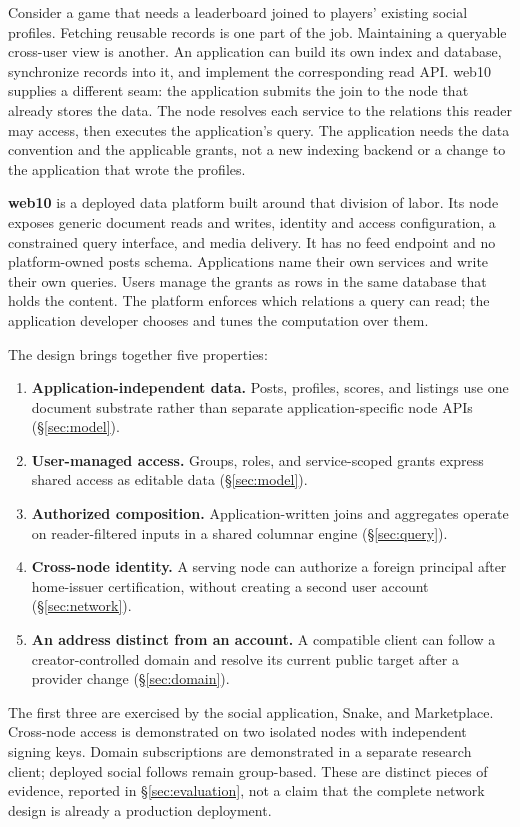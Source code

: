 \documentclass[sigconf, nonacm]{acmart}
\begin{document}
Consider a game that needs a leaderboard joined to players' existing
social profiles. Fetching reusable records is one part of the job.
Maintaining a queryable cross-user view is another. An application can
build its own index and database, synchronize records into it, and
implement the corresponding read API. web10 supplies a different seam:
the application submits the join to the node that already stores the
data. The node resolves each service to the relations this reader may
access, then executes the application's query. The application needs
the data convention and the applicable grants, not a new indexing
backend or a change to the application that wrote the profiles.

\textbf{web10} is a deployed data platform built around that division of
labor. Its node exposes generic document reads and writes, identity and
access configuration, a constrained query interface, and media delivery.
It has no feed endpoint and no platform-owned posts schema. Applications
name their own services and write their own queries. Users manage the
grants as rows in the same database that holds the content. The platform
enforces which relations a query can read; the application developer
chooses and tunes the computation over them.

The design brings together five properties:
\begin{enumerate}[leftmargin=*,nosep]
\item \textbf{Application-independent data.} Posts, profiles, scores,
and listings use one document substrate rather than separate
application-specific node APIs (\S\ref{sec:model}).
\item \textbf{User-managed access.} Groups, roles, and service-scoped
grants express shared access as editable data (\S\ref{sec:model}).
\item \textbf{Authorized composition.} Application-written joins and
aggregates operate on reader-filtered inputs in a shared columnar
engine (\S\ref{sec:query}).
\item \textbf{Cross-node identity.} A serving node can authorize a
foreign principal after home-issuer certification, without creating a
second user account (\S\ref{sec:network}).
\item \textbf{An address distinct from an account.} A compatible client
can follow a creator-controlled domain and resolve its current public
target after a provider change (\S\ref{sec:domain}).
\end{enumerate}

The first three are exercised by the social application, Snake, and
Marketplace. Cross-node access is demonstrated on two isolated nodes
with independent signing keys. Domain subscriptions are demonstrated
in a separate research client; deployed social follows remain
group-based. These are distinct pieces of evidence, reported in
\S\ref{sec:evaluation}, not a claim that the complete network design is
already a production deployment.
\end{document}
